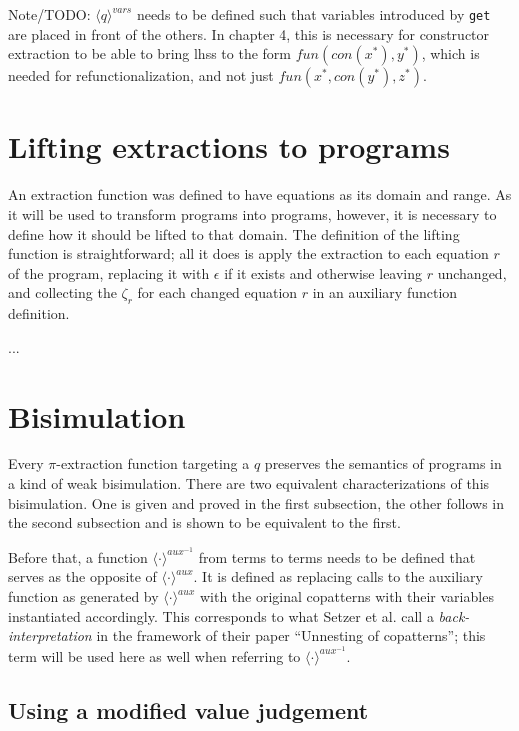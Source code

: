 Note/TODO: $\langle q \rangle^{vars}$ needs to be defined such that variables introduced by \texttt{get} are placed in front of the others. In chapter 4, this is necessary for constructor extraction to be able to bring lhss to the form $fun(con(x^*), y^*)$, which is needed for refunctionalization, and not just $fun(x^*, con(y^*), z^*)$.

\section{Lifting extractions to programs}

An extraction function was defined to have equations as its domain and range. As it will be used to transform programs into programs, however, it is necessary to define how it should be lifted to that domain. The definition of the lifting function is straightforward; all it does is apply the extraction to each equation $r$ of the program, replacing it with $\epsilon$ if it exists and otherwise leaving $r$ unchanged, and collecting the $\zeta_r$ for each changed equation $r$ in an auxiliary function definition.

...

\section{Bisimulation}

Every $\pi$-extraction function targeting a $q$ preserves the semantics of programs in a kind of weak bisimulation. There are two equivalent characterizations of this bisimulation. One is given and proved in the first subsection, the other follows in the second subsection and is shown to be equivalent to the first.

Before that, a function $\langle \cdot \rangle^{aux^{-1}}$ from terms to terms needs to be defined that serves as the opposite of $\langle \cdot \rangle^{aux}$. It is defined as replacing calls to the auxiliary function as generated by $\langle \cdot \rangle^{aux}$ with the original copatterns with their variables instantiated accordingly. This corresponds to what Setzer et al. call a \textit{back-interpretation} in the framework of their paper ``Unnesting of copatterns''; this term will be used here as well when referring to $\langle \cdot \rangle^{aux^{-1}}$.

\subsection{Using a modified value judgement}

